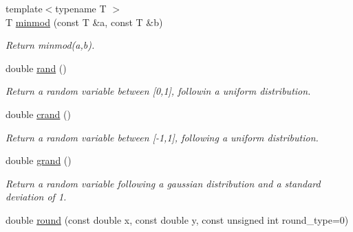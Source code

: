 \begin{DoxyCompactItemize}
\item 
{\footnotesize template$<$typename T $>$ }\\T \hyperlink{namespacecimg__library_1_1cimg_a5ae603a367d3f1b9199fc3060336493f}{minmod} (const T \&a, const T \&b)
\begin{DoxyCompactList}\small\item\em Return minmod({\ttfamily a},{\ttfamily b}). \item\end{DoxyCompactList}\item 
\hypertarget{namespacecimg__library_1_1cimg_af31db729637ea4dad61e49e5729839c4}{
double \hyperlink{namespacecimg__library_1_1cimg_af31db729637ea4dad61e49e5729839c4}{rand} ()}
\label{namespacecimg__library_1_1cimg_af31db729637ea4dad61e49e5729839c4}

\begin{DoxyCompactList}\small\item\em Return a random variable between \mbox{[}0,1\mbox{]}, followin a uniform distribution. \item\end{DoxyCompactList}\item 
\hypertarget{namespacecimg__library_1_1cimg_aae82972570fdc0904d4f03df7b5d3023}{
double \hyperlink{namespacecimg__library_1_1cimg_aae82972570fdc0904d4f03df7b5d3023}{crand} ()}
\label{namespacecimg__library_1_1cimg_aae82972570fdc0904d4f03df7b5d3023}

\begin{DoxyCompactList}\small\item\em Return a random variable between \mbox{[}-\/1,1\mbox{]}, following a uniform distribution. \item\end{DoxyCompactList}\item 
\hypertarget{namespacecimg__library_1_1cimg_a0341a323738439349625b2de5f35bb4c}{
double \hyperlink{namespacecimg__library_1_1cimg_a0341a323738439349625b2de5f35bb4c}{grand} ()}
\label{namespacecimg__library_1_1cimg_a0341a323738439349625b2de5f35bb4c}

\begin{DoxyCompactList}\small\item\em Return a random variable following a gaussian distribution and a standard deviation of 1. \item\end{DoxyCompactList}\item 
\hypertarget{namespacecimg__library_1_1cimg_aea674560ff8416d8f1753271865f3d65}{
double \hyperlink{namespacecimg__library_1_1cimg_aea674560ff8416d8f1753271865f3d65}{round} (const double x, const double y, const unsigned int round\_\-type=0)}
\label{namespacecimg__library_1_1cimg_aea674560ff8416d8f1753271865f3d65}


\end{DoxyCompactItemize}
